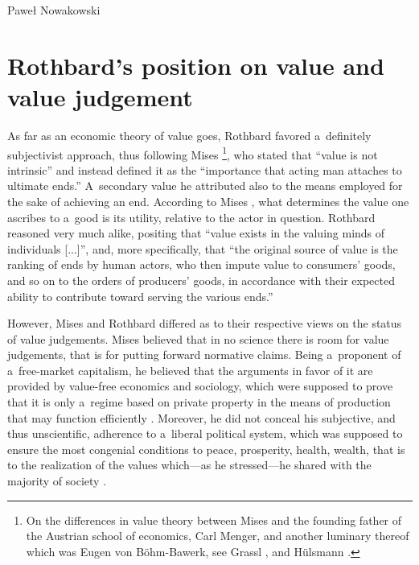 \begin{artengenv}{Paweł Nowakowski}
\section{Rothbard's position on value and value judgement}

As far as an economic theory of value goes, Rothbard favored a~definitely subjectivist approach, thus following Mises \footnote{On the differences in value theory between Mises and the founding father of the Austrian school of economics, Carl Menger, and another luminary thereof which was Eugen von Böhm-Bawerk, see Grassl 
\parencite*[][pp.531–559]{Grassl2017Toward}, %
 and Hülsmann 
\parencite*[][pp.388–391]{Hulsmann2007Mises}.%
}, who stated that ``value is not intrinsic'' and instead defined it as the ``importance that acting man attaches to ultimate ends.'' A~secondary value he attributed also to the means employed for the sake of achieving an end. According to Mises 
\parencite*[][p.121]{Mises2008Human}, %
 what determines the value one ascribes to a~good is its utility, relative to the actor in question. Rothbard 
\parencite*[][pp.103]{Rothbard2009Man} %
 reasoned very much alike, positing that ``value exists in the valuing minds of individuals [...]'', and, more specifically, that ``the original source of value is the ranking of ends by human actors, who then impute value to consumers' goods, and so on to the orders of producers' goods, in accordance with their expected ability to contribute toward serving the various ends.''



However, Mises and Rothbard differed as to their respective views on the status of value judgements. Mises 
\parencite[see, e.g. 2008, p.10,][]{Mises2008Human} %
 believed that in no science there is room for value judgements, that is for putting forward normative claims. Being a~proponent of a~free-market capitalism, he believed that the arguments in favor of it are provided by value-free economics and sociology, which were supposed to prove that it is only a~regime based on private property in the means of production that may function efficiently 
\parencite[][p.86]{Mises2010Liberalism}. %
 Moreover, he did not conceal his subjective, and thus unscientific, adherence to a~liberal political system, which was supposed to ensure the most congenial conditions to peace, prosperity, health, wealth, that is to the realization of the values which---as he stressed---he shared with the majority of society 
\parencite[see][pp.93–94]{Rothbard1997Praxeology}.%





\end{artengenv}
